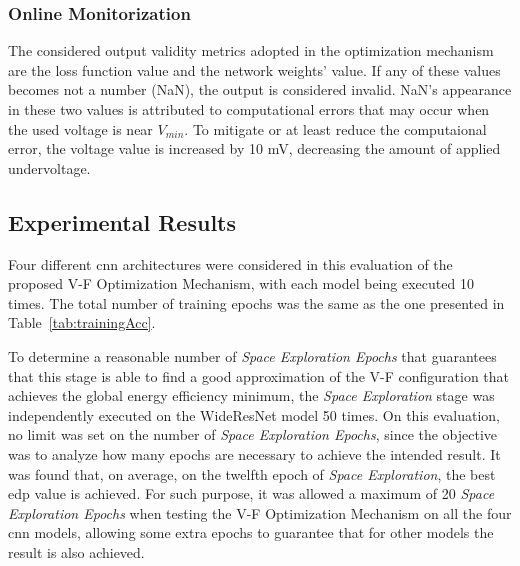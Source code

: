 

\subsubsection{Online Monitorization}

The considered output validity metrics adopted in the optimization mechanism are the loss function value and the network weights' value. If any of these values becomes not a number (NaN), the output is considered invalid. NaN's appearance in these two values is attributed to computational errors that may occur when the used voltage is near $V_{min}$. To mitigate or at least reduce the computaional error, the voltage value is increased by 10 mV, decreasing the amount of applied undervoltage.



\subsection{Experimental Results}

Four different \acrshort{cnn} architectures were considered in this evaluation of the proposed V-F Optimization Mechanism, with each model being executed 10 times. The total number of training epochs was the same as the one presented in Table~\ref{tab:trainingAcc}.

To determine a reasonable number of \textit{Space Exploration Epochs} that guarantees that this stage is able to find a good approximation of the V-F configuration that achieves the global energy efficiency minimum, the \textit{Space Exploration} stage was independently executed on the WideResNet model 50 times. On this evaluation, no limit was set on the number of \textit{Space Exploration Epochs}, since the objective was to analyze how many epochs are necessary to achieve the intended result. It was found that, on average, on the twelfth epoch of \textit{Space Exploration}, the best \acrshort{edp} value is achieved.
For such purpose, it was allowed a maximum of 20 \textit{Space Exploration Epochs} when testing the V-F Optimization Mechanism on all the four \acrshort{cnn} models, allowing some extra epochs to guarantee that for other models the result is also achieved.

